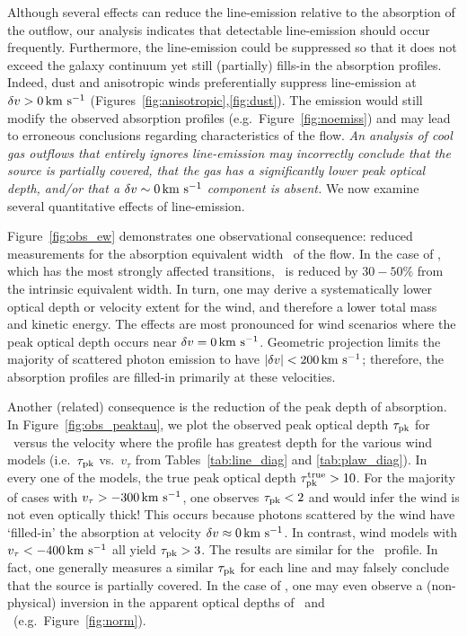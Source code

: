 \documentclass[12pt,preprint]{aastex}
\begin{document}
Although several effects can reduce the line-emission
relative to the absorption of the outflow, our analysis
indicates that detectable line-emission should occur frequently. 
Furthermore, the line-emission could be suppressed so %
that it does not
exceed
the galaxy continuum yet still (partially) fills-in the absorption
profiles. Indeed, dust and anisotropic winds preferentially suppress
line-emission at $\delta v > 0 \, {\rm km~s^{-1}}$
(Figures~\ref{fig:anisotropic},\ref{fig:dust}).
The emission would still 
modify the observed absorption profiles (e.g.\
Figure~\ref{fig:noemiss}) and may lead to erroneous conclusions
regarding characteristics of the flow.  {\it An analysis of cool gas outflows
that entirely ignores line-emission may incorrectly conclude that the source is
partially covered, that the gas has a significantly lower peak optical depth,
and/or that a $\delta v \sim 0 \, {\rm km~s^{-1}}$ component is
absent.}  
We now examine several quantitative effects of line-emission.

Figure~\ref{fig:obs_ew} demonstrates one observational
consequence: reduced measurements for the absorption
equivalent width \ewabs\ of the flow.  In the case of ,
which has the most strongly affected transitions, \ewabs\ is reduced by
$30-50\%$ from the intrinsic equivalent width.  In turn, one may derive 
a systematically lower optical depth or velocity extent for the wind,
and therefore a lower total mass and kinetic energy.  
The effects are most pronounced for wind
scenarios where the peak optical depth occurs near $\delta v = 0 \, {\rm km~s^{-1}}$.
Geometric projection limits the majority of scattered photon emission to
have $|\delta v| < 200 \, {\rm km~s^{-1}}$; therefore,  the absorption profiles
are filled-in primarily at these velocities.  

Another (related) consequence is the reduction of the peak depth of 
absorption.
In Figure~\ref{fig:obs_peaktau}, we plot the observed peak optical depth
$\tau_{\rm pk}$ for \mgiia\ 
versus the velocity where the profile has greatest depth 
for the various wind models (i.e.\
$\tau_{\rm pk}$ vs.\ $v_\tau$ from Tables~\ref{tab:line_diag} and
\ref{tab:plaw_diag}).   In every one of the models, the true peak
optical depth $\tau_{\rm pk}^{\rm true} > 10$.  For the
majority of cases with $v_\tau > -300\, {\rm km~s^{-1}}$, one observes $\tau_{\rm pk} <
2$ and would infer the wind is not even optically thick!
This occurs because photons scattered by the wind have `filled-in' the
absorption at velocity $\delta v \approx 0 \, {\rm km~s^{-1}}$.  In contrast, wind
models with $v_\tau < -400 \, {\rm km~s^{-1}}$ all yield $\tau_{\rm pk} > 3$.  The
results are similar for the \mgiib\ profile.  In fact, one generally
measures a similar $\tau_{\rm pk}$ for each \ion{Mg}{2} line and %
may 
falsely conclude that the source is partially covered. 
In the case of \ion{Fe}{2}, one may even observe a (non-physical)
inversion in the apparent optical depths of \feiia\ and \feiib\ (e.g.\
Figure~\ref{fig:norm}). 
\end{document}

